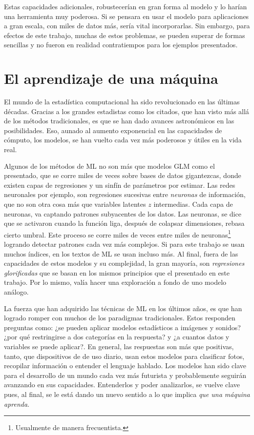 \documentclass[../Main/Main.tex]{subfiles}
\begin{document}
Estas capacidades adicionales, robustecerían en gran forma al modelo y lo harían una herramienta muy poderosa. Si se pensara en usar el modelo para aplicaciones a gran escala, con miles de datos más, sería vital incorporarlas. Sin embargo, para efectos de este trabajo, muchas de estos problemas, se pueden superar de formas sencillas y no fueron en realidad contratiempos para los ejemplos presentados. 

\section{El aprendizaje de una máquina}
El mundo de la estadística computacional ha sido revolucionado en las últimas décadas. Gracias a los grandes estadistas como los citados, que han visto más allá de los métodos tradicionales, es que se han dado avances astronómicos en las posibilidades. Eso, aunado al aumento exponencial en las capacidades de cómputo, los modelos, se han vuelto cada vez más poderosos y útiles en la vida real.

Algunos de los métodos de ML no son más que modelos GLM como el presentado, que se corre miles de veces sobre bases de datos gigantezcas, donde existen capas de regresiones y un sinfín de parámetros por estimar. Las redes neuronales por ejemplo, son regresiones sucesivas entre \textit{neuronas} de información, que no son otra cosa más que variables latentes $z$ intermedias. Cada capa de neuronas, va captando patrones subyacentes de los datos. Las neuronas, se dice que se activaron cuando la función liga, después de colapsar dimensiones, rebasa cierto umbral. Este proceso se corre miles de veces entre miles de neuronas\footnote{Usualmente de manera frecuentista.} logrando detectar patrones cada vez más complejos. Si para este trabajo se usan muchos índices, en los textos de ML se usan incluso más. Al final, fuera de las capacidades de estos modelos y su complejidad, la gran mayoría, son \textit{regresiones glorificadas} que se basan en los mismos principios que el presentado en este trabajo. Por lo mismo, valía hacer una exploración a fondo de uno modelo análogo.

La fuerza que han adquirido las técnicas de ML en los últimos años, es que han logrado romper con muchos de los paradigmas tradicionales. Estos responden preguntas como: ¿se pueden aplicar modelos estadísticos a imágenes y sonidos? ¿por qué restringirse a dos categorías en la respuesta? y ¿a cuantos datos y variables se puede aplicar?. En general, las respuestas son más que positivas, tanto, que dispositivos de de uso diario, usan estos modelos para clasificar fotos, recopilar información o entender el lenguaje hablado. Los modelos han sido clave para el desarrollo de un mundo cada vez más futurista y probablemente seguirán avanzando en sus capacidades. Entenderlos y poder analizarlos, se vuelve clave  pues, al final, se le está dando un nuevo sentido a lo que implica \textit{que una máquina aprenda}.
\end{document}
